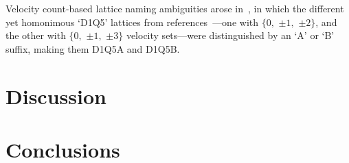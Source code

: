     Velocity count-based lattice naming ambiguities arose in~\cite{2017-PengY+ZhangJM-MathProblEng}, in which the different  yet
    homonimous            `D1Q5'            lattices            from            references~\cite{1998-QianYH+ZhouY-EuroPhysLett,
    2006-ChikatamarlaSS+KarlinIV-PhysRevLett}---one with $\{0,$ $\pm 1,$ $\pm 2\}$, and the other with $\{0,$ $\pm 1,$ $\pm 3\}$
    velocity sets---were distinguished by an `A' or `B' suffix, making them D1Q5A and D1Q5B.



\section{Discussion}



\section{Conclusions}


